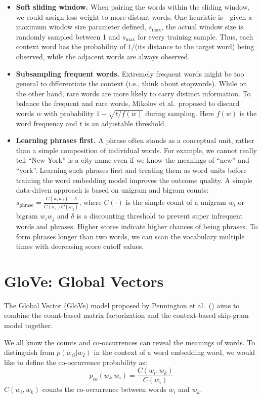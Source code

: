 \begin{itemize}
    \item \textbf{Soft sliding window.} When pairing the words within the sliding window, we could assign less weight to more distant words. One heuristic is---given a maximum window size parameter defined, $s_{\text{max}}$, the actual window size is randomly sampled between 1 and $s_{\text{max}}$ for every training sample. Thus, each context word has the probability of $1/$(its distance to the target word) being observed, while the adjacent words are always observed.
    \item \textbf{Subsampling frequent words.} Extremely frequent words might be too general to differentiate the context (i.e., think about stopwords). While on the other hand, rare words are more likely to carry distinct information. To balance the frequent and rare words, Mikolov et al.\ proposed to discard words $w$ with probability $1-\sqrt{t/f(w)}$ during sampling. Here $f(w)$ is the word frequency and $t$ is an adjustable threshold.
    \item \textbf{Learning phrases first.} A phrase often stands as a conceptual unit, rather than a simple composition of individual words. For example, we cannot really tell ``New York'' is a city name even if we know the meanings of ``new'' and ``york''. Learning such phrases first and treating them as word units before training the word embedding model improves the outcome quality. A simple data-driven approach is based on unigram and bigram counts: $s_{\text{phrase}} = \frac{C(w_i w_j) - \delta}{ C(w_i)C(w_j)}$, where $C(\cdot)$ is the simple count of a unigram $w_i$ or bigram $w_i w_j$ and $\delta$ is a discounting threshold to prevent super infrequent words and phrases. Higher scores indicate higher chances of being phrases. To form phrases longer than two words, we can scan the vocabulary multiple times with decreasing score cutoff values.
\end{itemize}

\section{GloVe: Global Vectors}

The Global Vector (GloVe) model proposed by Pennington et al.\ (\cite{pennington2014glove}) aims to combine the count-based matrix factorization and the context-based skip-gram model together.

We all know the counts and co-occurrences can reveal the meanings of words. To distinguish from $p(w_O \vert w_I)$ in the context of a word embedding word, we would like to define the co-occurrence probability as:
\[
p_{\text{co}}(w_k \vert w_i) = \frac{C(w_i, w_k)}{C(w_i)}
\]
$C(w_i, w_k)$ counts the co-occurrence between words $w_i$ and $w_k$.

